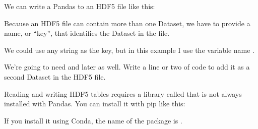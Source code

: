 \documentclass[letterpaper,10pt,english]{sphinxmanual}
\begin{document}
We can write a Pandas  to an HDF5 file like this:

\begin{sphinxVerbatim}[commandchars=\\\{\}]
  

 
\end{sphinxVerbatim}

Because an HDF5 file can contain more than one Dataset, we have to provide a name, or “key”, that identifies the Dataset in the file.

We could use any string as the key, but in this example I use the variable name .

 We’re going to need  and  later as well.  Write a line or two of code to add it as a second Dataset in the HDF5 file.

\begin{sphinxVerbatim}[commandchars=\\\{\}]

 
 
\end{sphinxVerbatim}

 Reading and writing HDF5 tables requires a library called  that is not always installed with Pandas.  You can install it with pip like this:

\begin{sphinxVerbatim}[commandchars=\\\{\}]
  
\end{sphinxVerbatim}

If you install it using Conda, the name of the package is .

\begin{sphinxVerbatim}[commandchars=\\\{\}]
  
\end{sphinxVerbatim}
\end{document}
